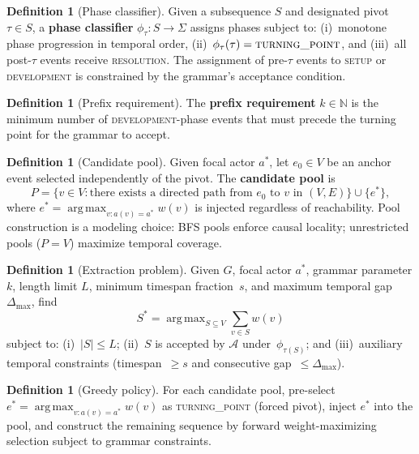 \documentclass[11pt]{article}
\theoremstyle{plain}
\theoremstyle{definition}
\newtheorem{definition}[theorem]{Definition}
\theoremstyle{remark}
\newcommand{\N}{\mathbb{N}}
\DeclareMathOperator*{\argmax}{arg\,max}
\begin{document}
\begin{definition}[Phase classifier]\label{def:classifier}
Given a subsequence $S$ and designated pivot $\tau \in S$, a
\textbf{phase classifier} $\phi_\tau \colon S \to \Sigma$ assigns
phases subject to: (i)~monotone phase progression in temporal order,
(ii)~$\phi_\tau(\tau) = \textsc{turning\_point}$, and (iii)~all
post-$\tau$ events receive \textsc{resolution}.  The assignment of
pre-$\tau$ events to \textsc{setup} or \textsc{development} is
constrained by the grammar's acceptance condition.
\end{definition}

\begin{definition}[Prefix requirement]\label{def:prefix}
The \textbf{prefix requirement} $k \in \N$ is the minimum number of
\textsc{development}-phase events that must precede the turning point
for the grammar to accept.
\end{definition}

\begin{definition}[Candidate pool]\label{def:pool}
Given focal actor $a^*$, let $e_0 \in V$ be an anchor event selected
independently of the pivot.  The \textbf{candidate pool} is
\[
  P = \{v \in V : \text{there exists a directed path from } e_0
  \text{ to } v \text{ in } (V,E)\} \cup \{e^*\},
\]
where $e^* = \argmax_{v : a(v) = a^*} w(v)$ is injected regardless of
reachability.  Pool construction is a modeling choice: BFS pools enforce
causal locality; unrestricted pools ($P = V$) maximize temporal
coverage.
\end{definition}

\begin{definition}[Extraction problem]\label{def:extraction}
Given $G$, focal actor $a^*$, grammar parameter $k$, length limit $L$,
minimum timespan fraction~$s$, and maximum temporal gap
$\Delta_{\max}$, find
\[
  S^* = \argmax_{S \subseteq V} \sum_{v \in S} w(v)
\]
subject to: (i)~$|S| \le L$; (ii)~$S$ is accepted by $\mathcal{A}$
under~$\phi_{\tau(S)}$; and (iii)~auxiliary temporal constraints
(timespan~$\ge s$ and consecutive gap~$\le \Delta_{\max}$).
\end{definition}

\begin{definition}[Greedy policy]\label{def:greedy}
For each candidate pool, pre-select
$e^* = \argmax_{v : a(v) = a^*} w(v)$ as \textsc{turning\_point}
(forced pivot), inject $e^*$ into the pool, and construct the
remaining sequence by forward weight-maximizing selection subject to
grammar constraints.
\end{definition}
\end{document}
